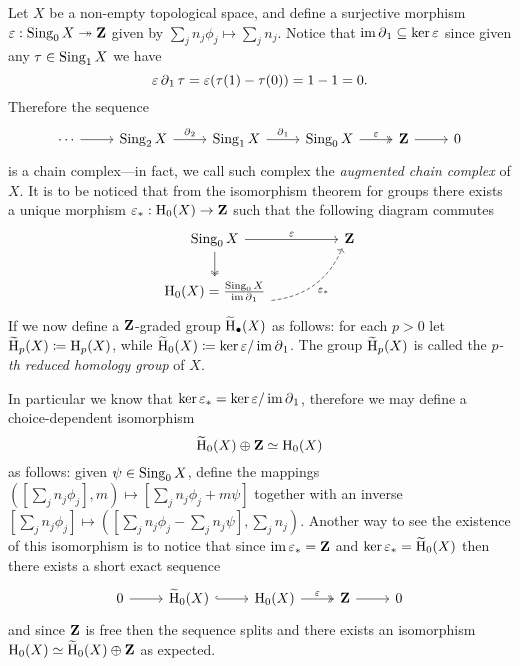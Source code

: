 \begin{definition}
    \label{def:reduced-homology}
    Let \(X\) be a non-empty topological space, and define a surjective morphism
    \(\varepsilon: \operatorname{Sing}_0 X \twoheadrightarrow \mathbf{Z}\) given by
    \(\sum_j n_j \phi_j \mapsto \sum_j n_j\). Notice that \(\operatorname{im} \operatorname{\partial}_1 \subseteq \ker \varepsilon\) since given any
    \(\tau \in \operatorname{Sing}_1 X\) we have
    \[
        \varepsilon \operatorname{\partial}_1 \tau = \varepsilon(\tau(1) - \tau(0)) = 1 - 1 = 0.
    \]
    Therefore the sequence
    \[
        \begin{tikzcd}
            \cdots \ar[r]
            &\Sing_2 X \ar[r, "\face_2"]
            &\Sing_1 X \ar[r, "\face_1"]
            &\Sing_0 X \ar[r, two heads, "\varepsilon"]
            &\Z
            \ar[r]
            &0
        \end{tikzcd}
    \]
    is a chain complex---in fact, we call such complex the \emph{augmented chain
        complex} of \(X\). It is to be noticed that from the isomorphism theorem for
    groups there exists a unique morphism \(\varepsilon_{*}: \operatorname{H}_0(X) \to \mathbf{Z}\) such that the
    following diagram commutes
    \[
        \begin{tikzcd}
            \Sing_0 X \ar[rr, "\varepsilon"] \ar[d, two heads]
            &&\Z \\
            \Hmlg_0(X) = \frac{\Sing_0 X}{\im \face_1}
            \ar[rru, dashed, bend right, "\varepsilon_{*}"']
            &&
        \end{tikzcd}
    \]
    If we now define a \(\mathbf{Z}\)-graded group \(\operatorname{\widetilde{H}}_{\bullet}(X)\) as follows: for each
    \(p > 0\) let \(\operatorname{\widetilde{H}}_p(X) \coloneq \operatorname{H}_p(X)\), while
    \(\operatorname{\widetilde{H}}_0(X) \coloneq \ker \varepsilon/\operatorname{im} \operatorname{\partial}_1\). The group \(\operatorname{\widetilde{H}}_p(X)\) is called the
    \emph{\(p\)-th reduced homology group} of \(X\).

    In particular we know that
    \(\ker \varepsilon_{*} = \ker \varepsilon/\operatorname{im} \operatorname{\partial}_1\), therefore we may define a choice-dependent
    isomorphism
    \[
        \operatorname{\widetilde{H}}_0(X) \oplus \mathbf{Z} \simeq \operatorname{H}_0(X)
    \]
    as follows: given \(\psi \in \operatorname{Sing}_0 X\), define the mappings
    \(([\sum_j n_j \phi_j], m) \mapsto [\sum_j n_j \phi_j + m \psi]\) together with an inverse
    \([\sum_j n_j \phi_j] \mapsto ([\sum_j n_j \phi_j - \sum_j n_j \psi], \sum_j n_j)\). Another way to see the
    existence of this isomorphism is to notice that since \(\operatorname{im} \varepsilon_{*} = \mathbf{Z}\) and
    \(\ker \varepsilon_{*} = \operatorname{\widetilde{H}}_0(X)\) then there exists a short exact sequence
    \[
        \begin{tikzcd}
            0 \ar[r]
            &\rHmlg_0(X) \ar[r, hook]
            &\Hmlg_0(X) \ar[r, two heads, "\varepsilon"]
            &\Z \ar[r]
            &0
        \end{tikzcd}
    \]
    and since \(\mathbf{Z}\) is free then the sequence splits and there exists an
    isomorphism \(\operatorname{H}_0(X) \simeq \operatorname{\widetilde{H}}_0(X) \oplus \mathbf{Z}\) as expected.
\end{definition}


